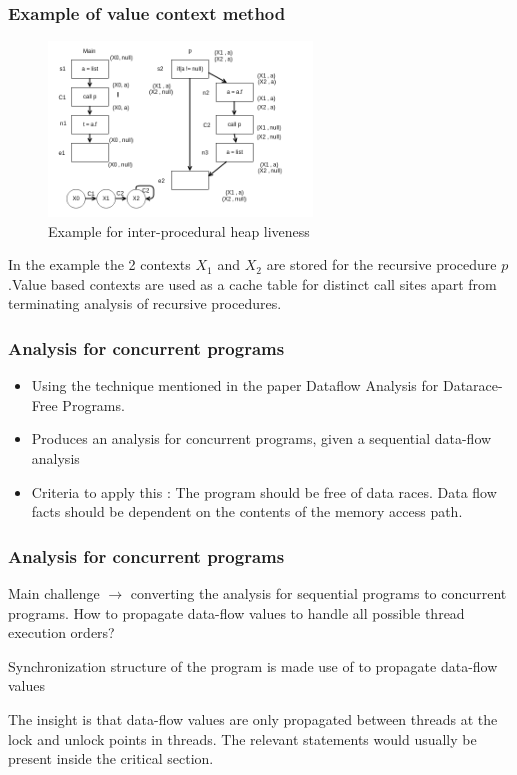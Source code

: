 \documentclass{beamer}
\begin{document}
  \begin{frame}
  \frametitle{Example of value context method}
\begin{figure}[here]
\begin{center}
\includegraphics[width=7cm]{Figures/interproc_example.png}
\end{center}
\caption{Example for inter-procedural heap liveness}
\label{fig:extreme}
\end{figure}
	
	In the example the 2 contexts $X_1$ and $X_2$ are stored for the recursive procedure $p$.Value based contexts are used as a cache table for distinct call sites apart from terminating analysis of recursive procedures.
	
	

  \end{frame}
  
  \begin{frame}
  \frametitle{Analysis for concurrent programs}
  
  \begin{itemize}
  	\item Using the technique mentioned in the paper Dataflow Analysis for Datarace-Free Programs.
  	\item Produces an analysis for concurrent programs, given a sequential data-flow analysis
  	\item Criteria to apply this : The program should be free of data races. Data flow facts should be dependent on the contents of the memory access path.
  \end{itemize}
  
  \end{frame}
  
\begin{frame}
\frametitle{Analysis for concurrent programs}
Main challenge $\rightarrow$ converting the analysis for sequential programs to concurrent programs. How to propagate data-flow values to handle all possible thread execution orders?

\vspace{\baselineskip}
Synchronization structure of the program is made use of to propagate data-flow values

\vspace{\baselineskip}
The insight is that data-flow values are only propagated between threads at the lock and unlock points in threads. The relevant statements would usually be present inside the critical section.

\end{frame}  
  
\end{document}
